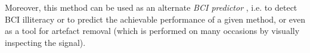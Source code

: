 \documentclass[entropy,article,submit,moreauthors,pdftex,10pt,a4paper]{mdpi}
\begin{document}
Moreover, this method can be used as an alternate \textit{BCI predictor} \citep{Clerc}, i.e. to detect BCI illiteracy or to predict the achievable performance of a given method, or even as a tool for artefact removal (which is performed on many occasions by visually inspecting the signal).

%
%
%
%



\vspace{6pt} 




\end{document}
